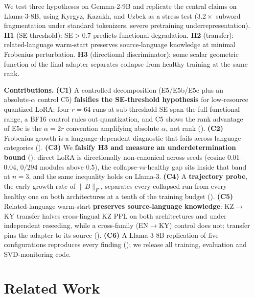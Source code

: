\documentclass[11pt]{article}
\begin{document}
We test three hypotheses on Gemma-2-9B and replicate the central claims on Llama-3-8B, using Kyrgyz, Kazakh, and Uzbek as a stress test ($3.2\times$ subword fragmentation under standard tokenizers, severe pretraining underrepresentation). \textbf{H1} (SE threshold): SE${>}0.7$ predicts functional degradation. \textbf{H2} (transfer): related-language warm-start preserves source-language knowledge at minimal Frobenius perturbation. \textbf{H3} (directional discriminator): some scalar geometric function of the final adapter separates collapse from healthy training at the same rank.

\textbf{Contributions.} \textbf{(C1)} A controlled decomposition (E5/E5b/E5c plus an absolute-$\alpha$ control C5) \textbf{falsifies the SE-threshold hypothesis} for low-resource quantized LoRA: four $r{=}64$ runs at sub-threshold SE span the full functional range, a BF16 control rules out quantization, and C5 shows the rank advantage of E5c is the $\alpha{=}2r$ convention amplifying absolute $\alpha$, not rank (). \textbf{(C2)} Frobenius growth is a language-dependent diagnostic that fails across language categories (). \textbf{(C3)} We \textbf{falsify H3 and measure an underdetermination bound} (): direct LoRA is directionally non-canonical across seeds (cosine $0.01$--$0.04$, $0/294$ modules above $0.5$), the collapse-vs-healthy gap sits inside that band at $n{=}3$, and the same inequality holds on Llama-3. \textbf{(C4)} A \textbf{trajectory probe}, the early growth rate of $\|B\|_F$, separates every collapsed run from every healthy one on both architectures at a tenth of the training budget (). \textbf{(C5)} Related-language warm-start \textbf{preserves source-language knowledge}: KZ$\rightarrow$KY transfer halves cross-lingual KZ PPL on both architectures and under independent reseeding, while a cross-family (EN$\rightarrow$KY) control does not; transfer pins the adapter to its source (). \textbf{(C6)} A Llama-3-8B replication of five configurations reproduces every finding (); we release all training, evaluation and SVD-monitoring code.

\section{Related Work}
\label{sec:related}
\end{document}
